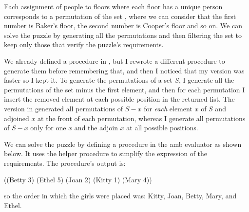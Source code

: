 \begin{exe}[4.41]
    Each assignment of people to floors where each floor has a unique person 
    corresponds to a permutation of the set , where we can 
    consider that the first number is Baker’s floor, the second number is 
    Cooper’s floor and so on. We can solve the puzzle by generating all the 
    permutations and then filtering the set to keep only those that verify the 
    puzzle’s requirements.

    We already defined a  procedure in 
    , but I rewrote a different procedure to 
    generate them before remembering that, and then I noticed that my version 
    was faster so I kept it. To generate the permutations of a set $S$, 
    I generate all the permutations of the set minus the first element, and then 
    for each permutation I insert the removed element at each possible position 
    in the returned list. The version in  
    generated all permutations of $S - x$ for \emph{each} element $x$ of $S$ and 
    adjoined $x$ at the front of each permutation, whereas I generate all 
    permutations of $S - x$ only for one $x$ and the adjoin $x$ at all possible 
    positions.
\end{exe}

\begin{exe}[4.42]
    We can solve the puzzle by defining a  procedure in the amb 
    evaluator as shown below. It uses the helper procedure  to 
    simplify the expression of the requirements.
    The procedure’s output is:
    \begin{cscm}
        ((Betty 3) (Ethel 5) (Joan 2) (Kitty 1) (Mary 4))
    \end{cscm}
    so the order in which the girls were placed was: Kitty, Joan, Betty, Mary, 
    and Ethel.
\end{exe}

